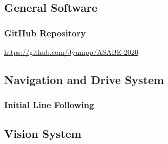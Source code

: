 \documentclass[11pt, hidelinks]{report}
\begin{document}
\subsection{General Software} \label{app:software}
\subsubsection{GitHub Repository} \label{app:github}
	\begin{center}
	    \url{https://github.com/Jyumpp/ASABE-2020}
	\end{center}

\subsection{Navigation and Drive System} \label{app:nav}
\subsubsection{Initial Line Following} \label{app:ogline}
    \begin{center}
    \end{center}

\subsection{Vision System} \label{app:vision}
\end{document}
